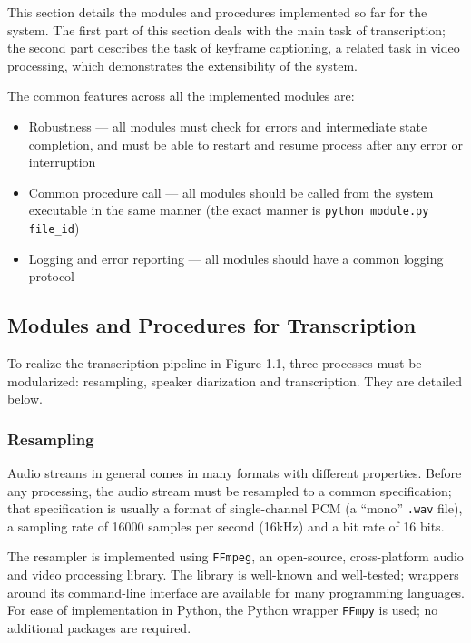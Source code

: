 This section details the modules and procedures implemented so far for the system.
The first part of this section deals with the main task of transcription; the second
part describes the task of keyframe captioning, a related task in video processing,
which demonstrates the extensibility of the system.

The common features across all the implemented modules are:

\begin{itemize}
    \item Robustness --- all modules must check for errors and intermediate state
    completion, and must be able to restart and resume process after any error or
    interruption
    \item Common procedure call --- all modules should be called from the system
    executable in the same manner (the exact manner is
    \texttt{python module.py file\_id})
    \item Logging and error reporting --- all modules should have a common logging
    protocol
\end{itemize}

\subsection{Modules and Procedures for Transcription}

To realize the transcription pipeline in Figure 1.1, three processes must be
modularized: resampling, speaker diarization and transcription. They are detailed
below.

\subsubsection{Resampling}

Audio streams in general comes in many formats with different properties. Before
any processing, the audio stream must be resampled to a common specification; that
specification is usually a format of single-channel PCM (a ``mono'' \texttt{.wav}
file), a sampling rate of 16000 samples per second (16kHz) and a bit rate of 16 bits.

The resampler is implemented using \texttt{FFmpeg}, an open-source, cross-platform
audio and video processing library. The library is well-known and well-tested;
wrappers around its command-line interface are available for many programming
languages. For ease of implementation in Python, the Python wrapper \texttt{FFmpy}
is used; no additional packages are required.

